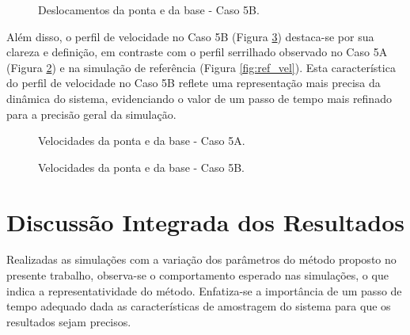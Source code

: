 \begin{figure}[H]
    \centering
    \hfill
    \caption{Deslocamentos da ponta e da base - Caso 5B.}
    \label{fig:4B_des}
\end{figure}
Além disso, o perfil de velocidade no Caso 5B (Figura \ref{fig:4B_vel}) destaca-se por sua clareza e definição, em contraste com o perfil serrilhado observado no Caso 5A (Figura \ref{fig:4A_vel}) e na simulação de referência (Figura \ref{fig:ref_vel}). Esta característica do perfil de velocidade no Caso 5B reflete uma representação mais precisa da dinâmica do sistema, evidenciando o valor de um passo de tempo mais refinado para a precisão geral da simulação.

\begin{figure}[H]
    \centering
    \hfill
    \caption{Velocidades da ponta e da base - Caso 5A.}
    \label{fig:4A_vel}
\end{figure}

\begin{figure}[H]
    \centering
    \hfill
    \caption{Velocidades da ponta e da base - Caso 5B.}
    \label{fig:4B_vel}
\end{figure}

\section{Discussão Integrada dos Resultados}
Realizadas as simulações com a variação dos parâmetros do método proposto no presente trabalho, observa-se o comportamento esperado nas simulações, o que indica a representatividade do método. Enfatiza-se a importância de um passo de tempo adequado dada as características de amostragem do sistema para que os resultados sejam precisos. 

